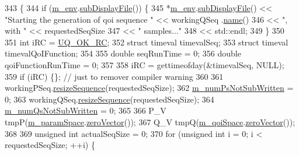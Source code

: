 \begin{DoxyCode}
343 \{
344   \textcolor{keywordflow}{if} (\hyperlink{class_q_u_e_s_o_1_1_monte_carlo_s_g_a30055a359b22cde54681679aed8ae6e7}{m\_env}.\hyperlink{class_q_u_e_s_o_1_1_base_environment_a8a0064746ae8dddfece4229b9ad374d6}{subDisplayFile}()) \{
345     *\hyperlink{class_q_u_e_s_o_1_1_monte_carlo_s_g_a30055a359b22cde54681679aed8ae6e7}{m\_env}.\hyperlink{class_q_u_e_s_o_1_1_base_environment_a8a0064746ae8dddfece4229b9ad374d6}{subDisplayFile}() << \textcolor{stringliteral}{"Starting the generation of qoi sequence "} << workingQSeq
      .\hyperlink{class_q_u_e_s_o_1_1_base_vector_sequence_a48f6fe02cf77f4233d3bcdfef3870f19}{name}()
346                             << \textcolor{stringliteral}{", with "}                                  << requestedSeqSize
347                             << \textcolor{stringliteral}{" samples..."}
348                             << std::endl;
349   \}
350 
351   \textcolor{keywordtype}{int} iRC = \hyperlink{namespace_q_u_e_s_o_a8e909502900aecf24cedba022ea84471}{UQ\_OK\_RC};
352   \textcolor{keyword}{struct }timeval timevalSeq;
353   \textcolor{keyword}{struct }timeval timevalQoIFunction;
354 
355   \textcolor{keywordtype}{double} seqRunTime         = 0;
356   \textcolor{keywordtype}{double} qoiFunctionRunTime = 0;
357 
358   iRC = gettimeofday(&timevalSeq, NULL);
359   \textcolor{keywordflow}{if} (iRC) \{\}; \textcolor{comment}{// just to remover compiler warning}
360 
361   workingPSeq.\hyperlink{class_q_u_e_s_o_1_1_base_vector_sequence_adc238af7f6e8af2402ab791de7d60af5}{resizeSequence}(requestedSeqSize);
362   \hyperlink{class_q_u_e_s_o_1_1_monte_carlo_s_g_a1bd46f12e850ab8d239205aafdae72af}{m\_numPsNotSubWritten} = 0;
363   workingQSeq.\hyperlink{class_q_u_e_s_o_1_1_base_vector_sequence_adc238af7f6e8af2402ab791de7d60af5}{resizeSequence}(requestedSeqSize);
364   \hyperlink{class_q_u_e_s_o_1_1_monte_carlo_s_g_af1d99dc1a3384fd294da7464ba1bda5f}{m\_numQsNotSubWritten} = 0;
365 
366   P\_V tmpP(\hyperlink{class_q_u_e_s_o_1_1_monte_carlo_s_g_a64620f0dd80c96f86918e1d711767b6f}{m\_paramSpace}.\hyperlink{class_q_u_e_s_o_1_1_vector_space_a92e963bb5cab3eecd290dfe4b8f03b04}{zeroVector}());
367   Q\_V tmpQ(\hyperlink{class_q_u_e_s_o_1_1_monte_carlo_s_g_a1df92e2ff2e7fa19d4ea158e71670ca3}{m\_qoiSpace}.\hyperlink{class_q_u_e_s_o_1_1_vector_space_a92e963bb5cab3eecd290dfe4b8f03b04}{zeroVector}());
368 
369   \textcolor{keywordtype}{unsigned} \textcolor{keywordtype}{int} actualSeqSize = 0;
370   \textcolor{keywordflow}{for} (\textcolor{keywordtype}{unsigned} \textcolor{keywordtype}{int} i = 0; i < requestedSeqSize; ++i) \{

\end{DoxyCode}
